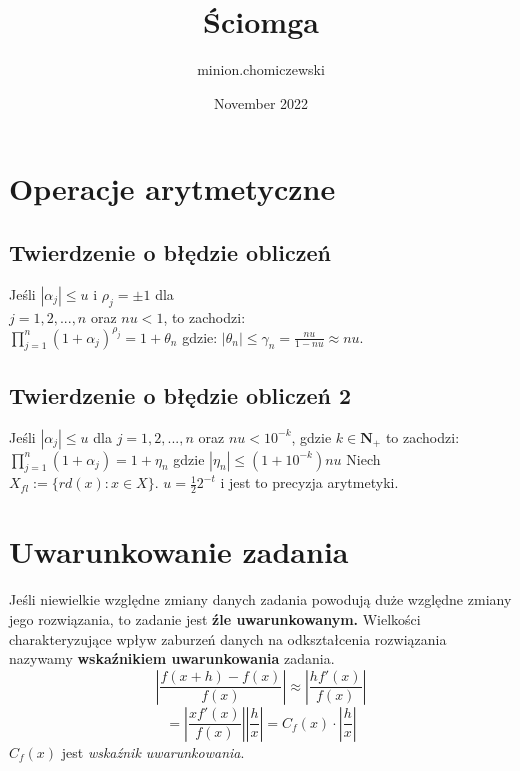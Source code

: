 \documentclass{article}
\title{Ściomga}
\author{minion.chomiczewski }
\date{November 2022}
\begin{document}
\setlength{\abovedisplayskip}{0.0pt}
\setlength{\belowdisplayskip}{0.0pt}
\setlength{\tabcolsep}{0.0pt}
\begin{minipage}[t]{.325\textwidth}
\section*{Operacje arytmetyczne}
\subsection*{Twierdzenie o błędzie obliczeń}
Jeśli $|\alpha_{j}| \leq u$ i $\rho_j = \pm 1$ dla \\ $j = 1,2,...,n$ oraz
$nu < 1$, to zachodzi:\\
$\prod_{j=1}^{n}(1+\alpha_j)^{\rho_j} = 1 + \theta_n$
gdzie: $|\theta_n| \leq \gamma_n = \frac{nu}{1-nu} \approx nu.$

\subsection*{Twierdzenie o błędzie obliczeń 2}
Jeśli $|\alpha_j| \leq u$ dla $j = 1,2,...,n$ oraz $nu < 10^{-k}$, gdzie $k \in \mathbf{N}_{+}$ to zachodzi: $\prod_{j=1}^{n}(1+\alpha_j) = 1 + \eta_n$
gdzie $|\eta_n| \leq (1 + 10^{-k})nu$
Niech $X_{fl} := \{rd(x) : x \in X\}$. $u = \frac{1}{2}2^{-t}$ i jest to precyzja arytmetyki.
\section*{Uwarunkowanie zadania}
Jeśli niewielkie względne zmiany danych zadania powodują duże względne zmiany jego rozwiązania, to zadanie jest \color{red} \textbf{źle uwarunkowanym. } \color{black} Wielkości charakteryzujące wpływ zaburzeń danych na odkształcenia rozwiązania nazywamy \color{red} \textbf{wskaźnikiem uwarunkowania } \color{black} zadania.
\begin{equation*}
    \left| \frac{f(x+h) - f(x)}{f(x)} \right| \approx \left| \frac{hf'(x)}{f(x)}\right|
\end{equation*}
\begin{equation*}
    = \left| \frac{xf'(x)}{f(x)}\right|\left| \frac{h}{x} \right| = C_f(x)\cdot\left|\frac{h}{x}\right|
\end{equation*}
$C_f(x)$ jest \color{red}\textit{wskaźnik uwarunkowania}\color{black}.

\end{minipage}
\end{document}
